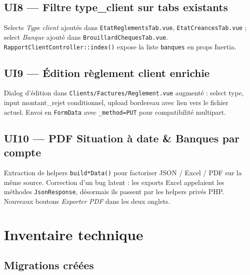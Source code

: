 \documentclass[11pt,a4paper]{article}
\newcommand{\modfile}[1]{\texttt{\small #1}}
\begin{document}
\subsection{UI8 --- Filtre type\_client sur tabs existants}

Selects \emph{Type client} ajoutés dans \modfile{EtatReglementsTab.vue},
\modfile{EtatCreancesTab.vue} ; select \emph{Banque} ajouté dans
\modfile{BrouillardChequesTab.vue}. \texttt{RapportClientController::index()}
expose la liste \texttt{banques} en props Inertia.

\subsection{UI9 --- Édition règlement client enrichie}

Dialog d'édition dans \modfile{Clients/Factures/Reglement.vue} augmenté :
select type, input montant\_rejet conditionnel, upload bordereau avec lien
vers le fichier actuel. Envoi en \texttt{FormData} avec \texttt{\_method=PUT}
pour compatibilité multipart.

\subsection{UI10 --- PDF Situation à date \& Banques par compte}

Extraction de helpers \texttt{build*Data()} pour factoriser JSON / Excel / PDF
sur la même source. Correction d'un bug latent : les exports Excel appelaient
les méthodes \texttt{JsonResponse}, désormais ils passent par les helpers
privés PHP. Nouveaux boutons \emph{Exporter PDF} dans les deux onglets.

\newpage

\section{Inventaire technique}

\subsection{Migrations créées}
\end{document}
